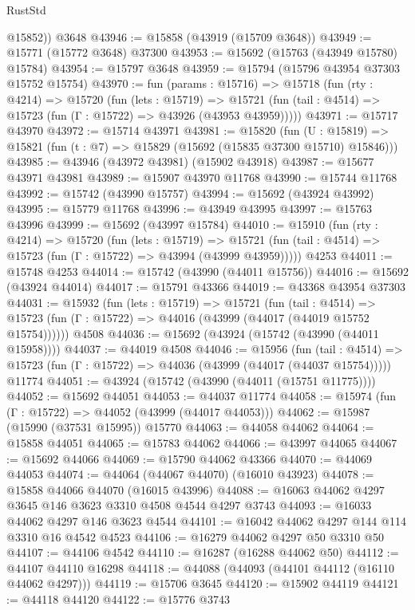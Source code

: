 \begin{lexlean}{RustStd}
\begin{coremodule}
        @15852))
    @3648
@43946 := @15858 (@43919 (@15709 @3648))
@43949 := @15771 (@15772 @3648) @37300
@43953 := @15692 (@15763 (@43949 @15780) @15784)
@43954 := @15797 @3648
@43959 := @15794 (@15796 @43954 @37303 @15752 @15754)
@43970 := fun (params : @15716) =>
  @15718
    (fun (rty : @4214) =>
    @15720
      (fun (lets : @15719) =>
      @15721 (fun (tail : @4514) => @15723 (fun (Γ : @15722) => @43926 (@43953 @43959)))))
@43971 := @15717 @43970
@43972 := @15714 @43971
@43981 := @15820
    (fun (U : @15819) => @15821 (fun (t : @7) => @15829 (@15692 (@15835 @37300 @15710) @15846)))
@43985 := @43946 (@43972 @43981) (@15902 @43918)
@43987 := @15677 @43971 @43981
@43989 := @15907 @43970 @11768
@43990 := @15744 @11768
@43992 := @15742 (@43990 @15757)
@43994 := @15692 (@43924 @43992)
@43995 := @15779 @11768
@43996 := @43949 @43995
@43997 := @15763 @43996
@43999 := @15692 (@43997 @15784)
@44010 := @15910
    (fun (rty : @4214) =>
    @15720
      (fun (lets : @15719) =>
      @15721 (fun (tail : @4514) => @15723 (fun (Γ : @15722) => @43994 (@43999 @43959)))))
    @4253
@44011 := @15748 @4253
@44014 := @15742 (@43990 (@44011 @15756))
@44016 := @15692 (@43924 @44014)
@44017 := @15791 @43366
@44019 := @43368 @43954 @37303
@44031 := @15932
    (fun (lets : @15719) =>
    @15721
      (fun (tail : @4514) =>
      @15723 (fun (Γ : @15722) => @44016 (@43999 (@44017 (@44019 @15752 @15754))))))
    @4508
@44036 := @15692 (@43924 (@15742 (@43990 (@44011 @15958))))
@44037 := @44019 @4508
@44046 := @15956
    (fun (tail : @4514) => @15723 (fun (Γ : @15722) => @44036 (@43999 (@44017 (@44037 @15754)))))
    @11774
@44051 := @43924 (@15742 (@43990 (@44011 (@15751 @11775))))
@44052 := @15692 @44051
@44053 := @44037 @11774
@44058 := @15974 (fun (Γ : @15722) => @44052 (@43999 (@44017 @44053)))
@44062 := @15987 (@15990 (@37531 @15995)) @15770
@44063 := @44058 @44062
@44064 := @15858 @44051
@44065 := @15783 @44062
@44066 := @43997 @44065
@44067 := @15692 @44066
@44069 := @15790 @44062 @43366
@44070 := @44069 @44053
@44074 := @44064 (@44067 @44070) (@16010 @43923)
@44078 := @15858 @44066 @44070 (@16015 @43996)
@44088 := @16063 @44062 @4297 @3645 @146 @3623 @3310 @4508 @4544 @4297 @3743
@44093 := @16033 @44062 @4297 @146 @3623 @4544
@44101 := @16042 @44062 @4297 @144 @114 @3310 @16 @4542 @4523
@44106 := @16279 @44062 @4297 @50 @3310 @50
@44107 := @44106 @4542
@44110 := @16287 (@16288 @44062 @50)
@44112 := @44107 @44110 @16298
@44118 := @44088 (@44093 (@44101 @44112 (@16110 @44062 @4297)))
@44119 := @15706 @3645
@44120 := @15902 @44119
@44121 := @44118 @44120
@44122 := @15776 @3743

\end{coremodule}
\end{lexlean}

